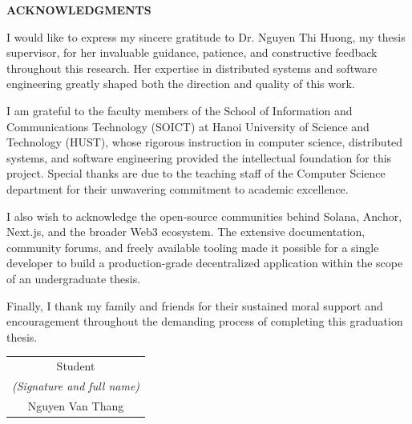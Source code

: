\begin{center}
    \Large{\textbf{ACKNOWLEDGMENTS}}
\end{center}
\vspace{1cm}

I would like to express my sincere gratitude to Dr. Nguyen Thi Huong, my thesis supervisor, for her invaluable guidance, patience, and constructive feedback throughout this research. Her expertise in distributed systems and software engineering greatly shaped both the direction and quality of this work.

I am grateful to the faculty members of the School of Information and Communications Technology (SOICT) at Hanoi University of Science and Technology (HUST), whose rigorous instruction in computer science, distributed systems, and software engineering provided the intellectual foundation for this project. Special thanks are due to the teaching staff of the Computer Science department for their unwavering commitment to academic excellence.

I also wish to acknowledge the open-source communities behind Solana, Anchor, Next.js, and the broader Web3 ecosystem. The extensive documentation, community forums, and freely available tooling made it possible for a single developer to build a production-grade decentralized application within the scope of an undergraduate thesis.

Finally, I thank my family and friends for their sustained moral support and encouragement throughout the demanding process of completing this graduation thesis.

\begin{flushright}
\begin{tabular}{@{}c@{}}
Student\\
\textit{(Signature and full name)}\\[1cm]
Nguyen Van Thang
\end{tabular}
\end{flushright}
